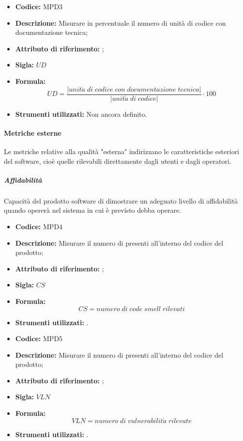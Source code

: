 \begin{itemize}
    \item \textbf{Codice:} MPD3
    \item \textbf{Descrizione:} Misurare in percentuale il numero di unità di codice con documentazione tecnica;
    \item \textbf{Attributo di riferimento:} ;
    \item \textbf{Sigla:} $UD$
    \item \textbf{Formula:} $$UD = \frac{|unit\grave{a} \; di \; codice \; con \; documentazione \; tecnica|}{|unit\grave{a} \; di \; codice|} \cdot 100$$
    \item \textbf{Strumenti utilizzati:} Non ancora definito.
\end{itemize}
              
       
\paragraph{Metriche esterne}
Le metriche relative alla qualità "esterna" indirizzano le caratteristiche esteriori del software, cioè quelle rilevabili direttamente dagli utenti e dagli operatori.

\subparagraph{Affidabilità}
Capacità del prodotto software di dimostrare un adeguato livello di affidabilità quando opererà nel sistema in cui è previsto debba operare.
  
\begin{itemize}
    \item \textbf{Codice:} MPD4
    \item \textbf{Descrizione:} Misurare il numero di  presenti all'interno del codice del prodotto;
    \item \textbf{Attributo di riferimento:} ;
    \item \textbf{Sigla:} $CS$
    \item \textbf{Formula:} $$CS = {numero \; di \; code \; smell \; rilevati}$$
    \item \textbf{Strumenti utilizzati:} .
\end{itemize}

\begin{itemize}
    \item \textbf{Codice:} MPD5
    \item \textbf{Descrizione:} Misurare il numero di  presenti all'interno del codice del prodotto;
    \item \textbf{Attributo di riferimento:} ;
    \item \textbf{Sigla:} $VLN$
    \item \textbf{Formula:} $$VLN = {numero \; di \; vulnerabilit\grave{a} \; rilevate}$$
    \item \textbf{Strumenti utilizzati:} .
\end{itemize}

